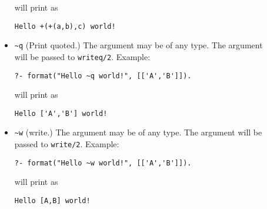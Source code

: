 \begin{description}
\begin{itemize}
\noindent
will print as

\begin{verbatim}
Hello +(+(a,b),c) world!
\end{verbatim}


\item \verb|~q|
(Print quoted.) The argument may be of any type.  The argument will be
passed to {\tt writeq/2}.  Example:

\begin{verbatim}
?- format("Hello ~q world!", [['A','B']]).
\end{verbatim}

\noindent
will print as

\begin{verbatim}
Hello ['A','B'] world!
\end{verbatim}

\item \verb|~w|
(write.) The argument may be of any type.  The argument will be passed
to {\tt write/2}.  Example:

\begin{verbatim}
?- format("Hello ~w world!", [['A','B']]).
\end{verbatim}

\noindent
will print as

\begin{verbatim}
Hello [A,B] world!
\end{verbatim}


\end{itemize}
\end{description}

